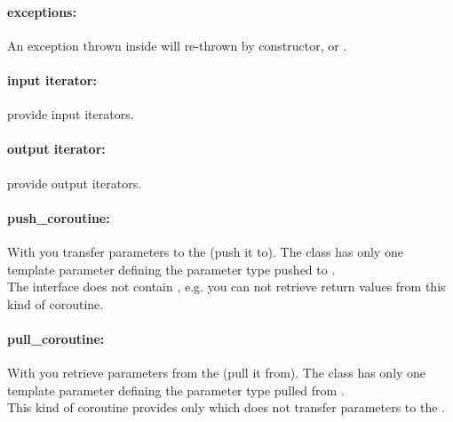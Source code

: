 \paragraph*{exceptions:}
An exception thrown inside \corofunction will re-thrown by \pullcoro constructor,
\pullcoroop or \pushcoroop.

\paragraph*{input iterator:}
\pullcoro provide input iterators.

\paragraph*{output iterator:}
\pushcoro provide output iterators.



\paragraph*{push\_coroutine:}
With \pushcoro you transfer parameters to the \corofunction (push it to). The
class has only one template parameter defining the parameter type pushed to
\corofunction.\\
\newline
The interface does not contain
\coroget, e.g. you can not retrieve return values from this kind of coroutine.

\paragraph*{pull\_coroutine:}
With \pullcoro you retrieve parameters from the \corofunction (pull it from).
The class has only one template parameter defining the parameter type pulled
from \corofunction.\\
\newline
This kind of coroutine provides only \pullcoroop which
does not transfer parameters to the \corofunction.


